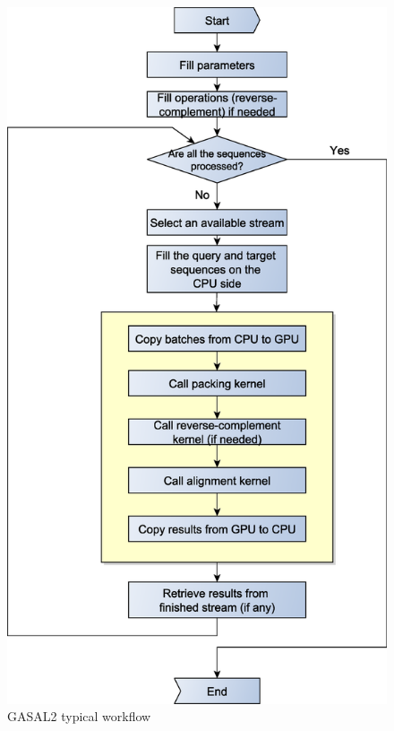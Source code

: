 \begin{figure}[p]
	\centering
	\includegraphics[width=0.85\linewidth]{dataflow}
	\caption{GASAL2 typical workflow}
	\label{fig:dataflow}
\end{figure}


